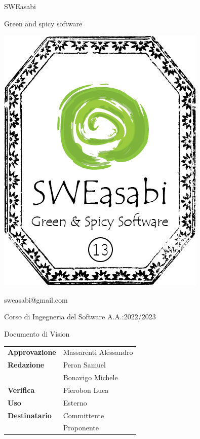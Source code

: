\documentclass{article}
\renewcommand{\title}{Documento di Vision}
\begin{document}
\begin{center}
\begin{center}
\begin{minipage}{0.49\linewidth}
\begin{flushright}
\begin{minipage}{0.5\linewidth}
\begin{center}
            \Large SWEasabi
    
            \tiny Green and spicy software
    
            \includegraphics[width=0.67\linewidth]{../../assets_globali/img/logo_13.png}
            
            \small sweasabi@gmail.com
    
            \end{center}
            \end{minipage}
            \end{flushright}
        \end{minipage}
    \end{center}

    \vspace{2cm}

    \normalsize Corso di Ingegneria del Software A.A.:2022/2023
    
    \Huge \title
        
    \vspace{2cm}
    
    \normalsize
    \begin{center}
        \begin{tabularx}{7cm}{l | X}            
            \textbf{Approvazione} & Massarenti Alessandro\\
            \textbf{Redazione} & Peron Samuel\\
            &Bonavigo Michele\\
            \textbf{Verifica} & Pierobon Luca\\
            \hline
            \textbf{Uso} & Esterno\\
            \textbf{Destinatario} & Committente\\
            & Proponente\\
        \end{tabularx}
    \end{center}
        
\end{center}
\end{document}
